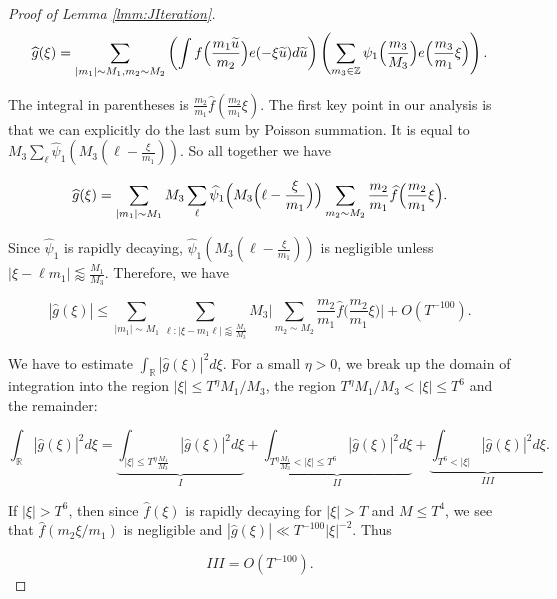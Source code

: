 \documentclass{amsart}
\theoremstyle{plain}
\numberwithin{equation}{section}
\renewcommand{\tilde}{\widetilde}
\newcommand{\RR}{\mathbb{R}}
\begin{document}
\begin{proof}[Proof of  Lemma \ref{lmm:JIteration}]
\[ \widehat{g}(\xi) =   \sum_{|m_1| \sim M_1, m_2 \sim M_2} \left( \int f \Big( \frac{m_1 \tilde{u}}{m_2}  \Big) e(- \xi \tilde{u}) d \tilde{u}\right)  \left( \sum_{m_3 \in \mathbb{Z}}   \psi_1\Bigl(\frac{m_3}{M_3}\Bigr)  e\Bigl(\frac{m_3}{m_1} \xi\Bigr) \right).  \]

The  integral in parentheses is $\frac{m_2}{m_1} \widehat{f}( \frac{m_2}{m_1} \xi )$.   The first key point in our analysis is that we can explicitly do the last sum by  Poisson summation.  It is equal to $M_3 \sum_{\ell} \widehat{\psi}_1( M_3 (\ell - \frac{\xi}{m_1}))$.    So all together we have


\[
 \widehat{g}(\xi) = \sum_{|m_1| \sim M_1} M_3 \sum_{\ell } \widehat{\psi}_1 \Bigl(M_3 \Bigl(\ell - \frac{\xi}{m_1}  \Bigr) \Bigr)  \sum_{m_2 \sim M_2}  \frac{m_2}{m_1} \widehat{f} \Big( \frac{m_2}{m_1} \xi \Big). 
 \]

Since $\widehat{\psi}_1$ is rapidly decaying, $\widehat{\psi}_1(M_3(\ell - \frac{\xi}{m_1} ))$ is negligible unless $| \xi - \ell m_1 | \lessapprox \frac{M_1}{M_3}$.  Therefore, we have

\begin{equation} 
| \widehat{g}(\xi) | \le \sum_{|m_1| \sim M_1}\sum_{\ell: |\xi - m_1 \ell| \lessapprox \frac{M_1}{M_3}} M_3  \Big|   \sum_{m_2 \sim M_2} \frac{m_2}{m_1} \widehat{f} \Big( \frac{m_2}{m_1} \xi \Big) \Big| +O(T^{-100}).
\label{hatg} 
\end{equation}

We have to estimate $\int_\RR |\widehat{g}(\xi)|^2 d \xi$.  
For a small $\eta>0$, we break up the domain of integration into the region $|\xi| \le T^\eta M_1/M_3$, the region $T^\eta M_1/M_3<|\xi|\le T^6$ and the remainder: 

\begin{equation}
 \int_\RR |\widehat{g}(\xi)|^2 d \xi =  \underbrace{ \int_{|\xi| \le T^\eta \frac{M_1}{M_3}} |\widehat{g}(\xi)|^2 d \xi}_{I} + \underbrace{\int_{T^\eta \frac{M_1}{M_3}<|\xi| \le T^6} |\widehat{g}(\xi)|^2 d \xi}_{II} + \underbrace{\int_{ T^6<|\xi|} |\widehat{g}(\xi)|^2 d \xi}_{III}. \label{eq:IntegralSplit}
 \end{equation}

If $|\xi|>T^6$, then since $\widehat{f}(\xi)$ is rapidly decaying for $|\xi| > T$ and $M\le T^4$, we see that $\widehat{f}(m_2\xi/m_1)$ is negligible and $|\widehat{g}(\xi)|\ll T^{-100}|\xi|^{-2}$. Thus

\begin{equation}
III=O(T^{-100}).
\label{eq:IIIBound}
\end{equation}


\end{proof}
\end{document}
